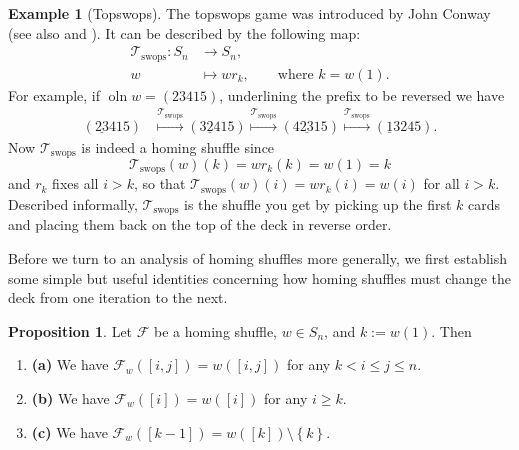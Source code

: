\documentclass[final,nomarks]{dmtcs-episciences}
\theoremstyle{definition}
\newtheorem{prop}[thm]{Proposition}
\theoremstyle{definition}
\newtheorem{exmp}[thm]{Example}
\theoremstyle{remark}
\newcommand{\f}{\mathcal{F}} %
\newcommand{\fw}{\mathcal{F}_w} %
\newcommand{\Ts}{\mathcal{T}_{\text{swops}}} %
\newcommand{\xmto}[1]{\overset{ #1 }{ \mapsto }}
\newcommand{\tup}[1]{\left( #1 \right)}
\newcommand{\set}[1]{\left\{ #1 \right\}}
\newcommand{\oln}{\operatorname{oln}}
\begin{document}
\begin{exmp}[Topswops]
    The topswops game was introduced by John Conway \cite[Chapter Six]{gardner2020} (see also \cite[Aufgabe 1]{BWM2002-2} and \cite[\S 7.2.1.2, Exercise 107]{TAoCP4A}).
    It can be described by the following map:
    \begin{align*}
        \Ts : S_{n} & \to S_{n},\\
        w & \mapsto w r_{k}, \qquad \text{where } k = w\tup{1}.
    \end{align*}
    For example, if $\oln{w} = \tup{23415}$, underlining the prefix to be reversed we have
    \begin{align*}
        \tup{\underline{23}415} &\xmto{\Ts} \tup{\underline{324}15} \xmto{\Ts} \tup{\underline{4231}5} \xmto{\Ts} \tup{\underline{1}3245}.
    \end{align*}
    Now $\Ts$ is indeed a homing shuffle since 
    \[
    \Ts\tup{ w }\tup{ k } = w r_{k}\tup{ k } = w\tup{ 1 } = k
    \]
    and $ r_{k} $ fixes all $ i > k $, so that $ \Ts\tup{ w }\tup{ i } = wr_{k}\tup{ i } = w\tup{ i } $ for all $ i > k $. Described informally, $\Ts$ is the shuffle you get by picking up the first $k$ cards and placing them back on the top of the deck in reverse order.
\end{exmp}

Before we turn to an analysis of homing shuffles more generally, we first establish some simple but useful identities concerning how homing shuffles must change the deck from one iteration to the next. 
\begin{prop}
    \label{prop1}
    Let $ \f $ be a homing shuffle, $ w \in S_{n} $, and $ k := w\tup{ 1 } $. Then
    \begin{enumerate}[]
        \item\textbf{(a)} We have $\fw\tup{ [i,j] } = w\tup{ [i,j] }$ for any $ k < i \le j \le n $.
        \item\textbf{(b)} We have $\fw\tup{ [i] } = w\tup{ [i] }$ for any $ i \ge k $.
        \item\textbf{(c)} We have $\fw\tup{ [k-1] } = w\tup{ [k] } \setminus \set{k}$.
    \end{enumerate}
\end{prop}
\end{document}
